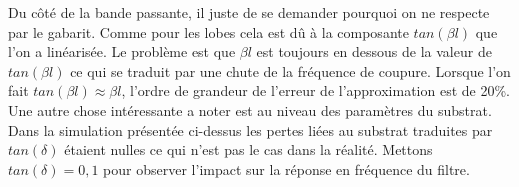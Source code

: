 \documentclass[french]{article}
\begin{document}
Du côté de la bande passante, il juste de se demander pourquoi on ne respecte par le gabarit. Comme pour les lobes cela est dû à la composante $tan(\beta l)$ que l'on a linéarisée. Le problème est que $\beta l$ est toujours en dessous de la valeur de $tan(\beta l)$ ce qui se traduit par une chute de la fréquence de coupure. Lorsque l'on fait $tan(\beta l) \approx \beta l$, l'ordre de grandeur de l'erreur de l'approximation est de 20\%.\\

Une autre chose intéressante a noter est au niveau des paramètres du substrat. Dans la simulation présentée ci-dessus les pertes liées au substrat traduites par $tan(\delta)$ étaient nulles ce qui n'est pas le cas dans la réalité. Mettons $tan(\delta) = 0,1$ pour observer l'impact sur la réponse en fréquence du filtre.
\end{document}
